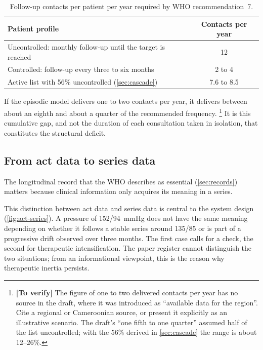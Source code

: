 \documentclass[12pt,a4paper,oneside]{report}
\newcommand{\verify}[1]{\footnote{\textbf{[To verify]} #1}}
\begin{document}
\begin{table}[htbp]
\centering\small
\caption{Follow-up contacts per patient per year required by WHO recommendation~7.}\label{tab:contacts}
\begin{tabularx}{\textwidth}{@{}X c@{}}
\toprule
\textbf{Patient profile} & \textbf{Contacts per year} \\
\midrule
Uncontrolled: monthly follow-up until the target is reached & 12 \\
Controlled: follow-up every three to six months & 2 to 4 \\
Active list with 56\% uncontrolled (\cref{sec:cascade}) & 7.6 to 8.5 \\
\bottomrule
\end{tabularx}
\end{table}

If the episodic model delivers one to two contacts per year, it delivers between about an eighth and about a quarter of the recommended frequency.%
\verify{The figure of one to two delivered contacts per year has no source in the draft, where it was introduced as ``available data for the region''. Cite a regional or Cameroonian source, or present it explicitly as an illustrative scenario. The draft's ``one fifth to one quarter'' assumed half of the list uncontrolled; with the 56\% derived in \cref{sec:cascade} the range is about 12--26\%.}
It is this cumulative gap, and not the duration of each consultation taken in isolation, that constitutes the structural deficit.

\subsection{From act data to series data}\label{sec:act-series}

The longitudinal record that the WHO describes as essential (\cref{sec:records}) matters because clinical information only acquires its meaning in a series.


This distinction between act data and series data is central to the system design (\cref{fig:act-series}). A pressure of 152/94~mmHg does not have the same meaning depending on whether it follows a stable series around 135/85 or is part of a progressive drift observed over three months. The first case calls for a check, the second for therapeutic intensification. The paper register cannot distinguish the two situations; from an informational viewpoint, this is the reason why therapeutic inertia persists.
\end{document}
